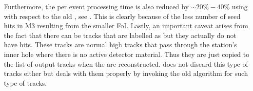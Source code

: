 Furthermore, the per event processing time is also reduced by $\sim 20\% - 40 \%$ using \mvTTm  
with respect to the old \mvm, see .
This is clearly because of the less number of seed hits in M3 resulting from the smaller FoI. Lastly, an important caveat arises from the fact that there can be tracks
that are labelled as \veloTTCand but they actually do not have \ttracker hits. These tracks are normal high \pt tracks that pass through the \ttracker station's inner hole
where there is no active detector material. 
Thus they are just copied to the list of output tracks when the \veloTTCand are reconstructed. 
\mvTTm does not discard this type of tracks either but deals with them properly 
by invoking the old \mvm algorithm for such type of tracks. 

